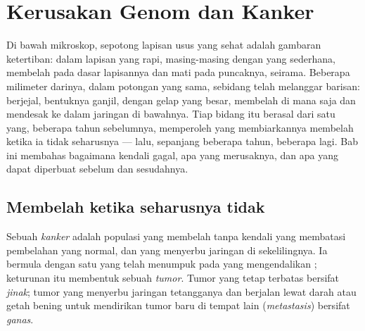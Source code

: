 \chapter{Kerusakan Genom dan Kanker}\label{ch:g11:cancer}

Di bawah mikroskop, sepotong lapisan usus yang sehat adalah gambaran
ketertiban:  dalam lapisan yang rapi, masing-masing dengan 
yang sederhana, membelah pada dasar lapisannya dan mati pada
puncaknya, seirama. Beberapa milimeter darinya, dalam potongan yang
sama, sebidang  telah melanggar barisan: berjejal, bentuknya ganjil,
dengan  gelap yang besar, membelah di mana saja dan mendesak ke
dalam jaringan di bawahnya. Tiap  bidang itu berasal dari satu 
yang, beberapa tahun sebelumnya, memperoleh  yang membiarkannya
membelah ketika ia tidak seharusnya --- lalu, sepanjang beberapa tahun,
beberapa  lagi. Bab ini membahas bagaimana kendali 
gagal, apa yang merusaknya, dan apa yang dapat diperbuat sebelum dan
sesudahnya.

\section{Membelah ketika seharusnya tidak}

\begin{definition}[Kanker]\label{def:g11:cancer:cancer}
Sebuah \emph{kanker} adalah populasi  yang membelah
tanpa kendali yang membatasi pembelahan  yang normal, dan yang
menyerbu jaringan di sekelilingnya. Ia bermula dengan satu  yang
 telah menumpuk  pada  yang mengendalikan ;
keturunan  itu membentuk sebuah \emph{tumor}. Tumor
yang tetap terbatas bersifat \emph{jinak}; tumor yang  menyerbu
jaringan tetangganya dan berjalan lewat darah atau getah bening untuk
mendirikan tumor baru di tempat lain (\emph{metastasis}) bersifat \emph{ganas}.
\end{definition}

